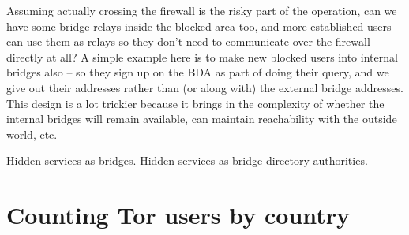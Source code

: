 \documentclass{llncs}
\begin{document}
Assuming actually crossing the firewall is the risky part of the
operation, can we have some bridge relays inside the blocked area too,
and more established users can use them as relays so they don't need to
communicate over the firewall directly at all? A simple example here is
to make new blocked users into internal bridges also -- so they sign up
on the BDA as part of doing their query, and we give out their addresses
rather than (or along with) the external bridge addresses. This design
is a lot trickier because it brings in the complexity of whether the
internal bridges will remain available, can maintain reachability with
the outside world, etc.

Hidden services as bridges. Hidden services as bridge directory authorities.

 

\appendix

\section{Counting Tor users by country}
\label{app:geoip}
\end{document}
